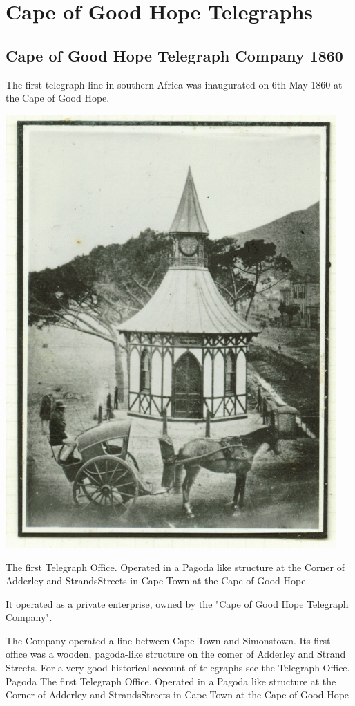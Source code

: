 \chapter{Cape of Good Hope Telegraphs
} 
\section{Cape of Good Hope Telegraph Company 1860}

The first telegraph line in southern Africa was inaugurated on 6th May 1860 
at the Cape of Good Hope.
\begin{marginfigure}
\includegraphics[width=0.95\textwidth]{../cape-of-good-hope/telegraph-office/Pagoda.jpg}
\caption{
 The first Telegraph Office. Operated in a Pagoda like structure at 
 the Corner of Adderley and StrandsStreets in Cape Town at the Cape 
 of Good Hope.
}
\end{marginfigure}
It operated as a private enterprise, owned by the "Cape of Good Hope 
Telegraph Company". 

The Company operated a line between Cape Town and Simonstown.  Its first office 
was a wooden, pagoda-like structure on the comer of Adderley and Strand Streets. For a very good historical account of telegraphs see the Telegraph Office.
Pagoda
The first Telegraph Office. Operated in a Pagoda like structure at the 
Corner of Adderley and StrandsStreets in Cape Town at the Cape of Good Hope



